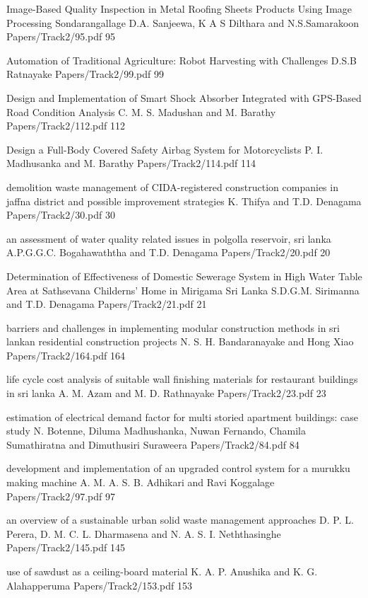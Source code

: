     \addpaper
{Image-Based Quality Inspection in Metal Roofing Sheets Products Using Image Processing}
 {Sondarangallage D.A. Sanjeewa, K A S Dilthara and N.S.Samarakoon} 
 {Papers/Track2/95.pdf}
   {95} 


    \addpaper
{Automation of Traditional Agriculture: Robot Harvesting with Challenges}
 {D.S.B Ratnayake} 
 {Papers/Track2/99.pdf}
   {99} 




\addpaper
{Design and Implementation of Smart Shock Absorber Integrated with GPS-Based Road Condition Analysis}
{C. M. S. Madushan and M. Barathy}
{Papers/Track2/112.pdf}
{112}


\addpaper
{Design a Full-Body Covered Safety Airbag System for Motorcyclists}
{P. I. Madhusanka and M. Barathy}
{Papers/Track2/114.pdf}
{114}



\addpaper
{demolition waste management of CIDA-registered construction companies in jaffna district and possible improvement strategies}
{K. Thifya and T.D. Denagama}
{Papers/Track2/30.pdf}
{30}

\addpaper
{an assessment of water quality related issues in polgolla reservoir, sri lanka}
{A.P.G.G.C. Bogahawaththa and T.D. Denagama}
{Papers/Track2/20.pdf}
{20}

\addpaper
{Determination of Effectiveness of Domestic Sewerage System in High Water Table Area at Sathsevana Childerns' Home in Mirigama Sri Lanka}
{S.D.G.M. Sirimanna and T.D. Denagama}
{Papers/Track2/21.pdf}
{21}

\addpaper
{barriers and challenges in implementing modular construction methods in sri lankan residential construction projects}
{N. S. H. Bandaranayake and Hong Xiao}
{Papers/Track2/164.pdf}
{164}

\addpaper
{life cycle cost analysis of suitable wall finishing materials for restaurant buildings in sri lanka}
{A. M. Azam and M. D. Rathnayake}
{Papers/Track2/23.pdf}
{23}

\addpaper
{estimation of electrical demand factor for multi
storied apartment buildings: case study}
{N. Botenne, Diluma Madhushanka, Nuwan Fernando,
Chamila Sumathiratna and Dimuthusiri Suraweera}
{Papers/Track2/84.pdf}
{84}

\addpaper
{development and implementation of an upgraded
control system for a murukku making machine}
{A. M. A. S. B. Adhikari and Ravi Koggalage}
{Papers/Track2/97.pdf}
{97}

\addpaper
{an overview of a sustainable urban solid waste management approaches}
{D. P. L. Perera, D. M. C. L. Dharmasena and N. A. S. I. Neththasinghe}
{Papers/Track2/145.pdf}
{145}

\addpaper
{use of sawdust as a ceiling-board material}
{K. A. P. Anushika and K. G. Alahapperuma}
{Papers/Track2/153.pdf}
{153}